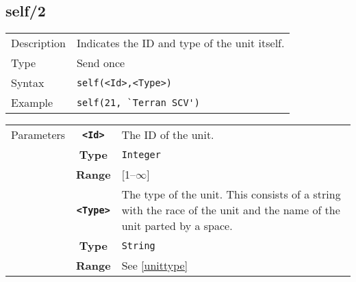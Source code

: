 \subsection{self/2}
\begin{tabularx}{\textwidth}{lX}
 Description & Indicates the ID and type of the unit itself. \\
 Type & Send once \\
 Syntax & \verb|self(<Id>,<Type>)| \\
 Example & \verb|self(21, `Terran SCV')|   \\
 \end{tabularx}
 \begin{tabularx}{\textwidth}{l | c | p{8cm}|}
 \cline{2-3}
 Parameters & \textbf{\verb|<Id>|} & The ID of the unit.\\
            & \textbf{Type} & \verb|Integer| \\
            & \textbf{Range} & [1--$\infty$] \\
            \cline{2-3}
            & \textbf{\verb|<Type>|} & The type of the unit. This consists of a string with the race of the unit and the name of the unit parted by a space. \\
            & \textbf{Type} & \verb|String| \\
            & \textbf{Range} & See \ref{unittype} \\
            \cline{2-3}
\end{tabularx}

